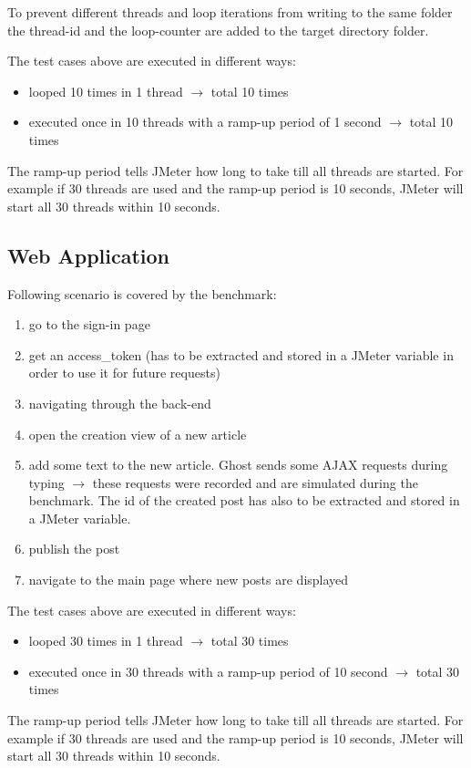 	To prevent different threads and loop iterations from writing to the same folder the thread-id and the loop-counter are added to the target directory folder.
	
	The test cases above are executed in different ways:
	\begin{itemize}
		\item looped 10 times in 1 thread $\rightarrow$ total 10 times
		\item executed once in 10 threads with a ramp-up period of 1 second  $\rightarrow$ total 10 times
	\end{itemize}
	The ramp-up period tells JMeter how long to take till all threads are started. For example if 30 threads are used and the ramp-up period is 10 seconds, JMeter will start all 30 threads within 10 seconds.
	\subsection{Web Application}
	\label{subsec:web-bechmark}
	Following scenario is covered by the benchmark:
	\begin{enumerate}
		\item go to the sign-in page
		\item get an access\_token (has to be extracted and stored in a JMeter variable in order to use it for future requests)
		\item navigating through the back-end
		\item open the creation view of a new article
		\item add some text to the new article. Ghost sends some AJAX requests during typing $\rightarrow$ these requests were recorded and are simulated during the benchmark. The id of the created post has also to be extracted and stored in a JMeter variable.
		\item publish the post
		\item navigate to the main page where new posts are displayed
	\end{enumerate}
	
	The test cases above are executed in different ways:
	\begin{itemize}
		\item looped 30 times in 1 thread $\rightarrow$ total 30 times
		\item executed once in 30 threads with a ramp-up period of 10 second  $\rightarrow$ total 30 times
	\end{itemize}
	The ramp-up period tells JMeter how long to take till all threads are started. For example if 30 threads are used and the ramp-up period is 10 seconds, JMeter will start all 30 threads within 10 seconds.	
	
